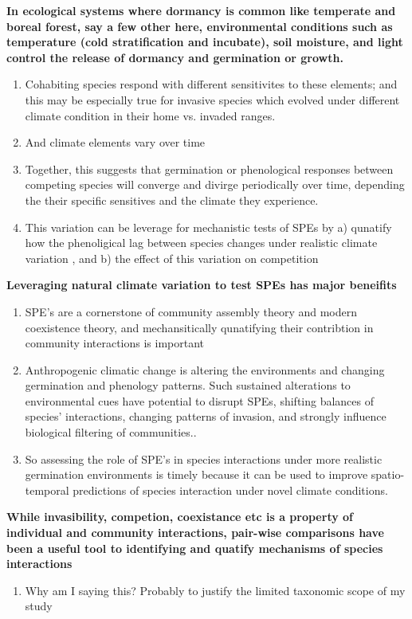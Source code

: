 \documentclass{article}\usepackage[]{graphicx}\usepackage[]{color}
\begin{document}
\textbf{In ecological systems where dormancy is common like temperate  and boreal forest, say a few other here, environmental conditions such as temperature (cold stratification and incubate), soil moisture, and light control the release of dormancy and germination or growth.}
\begin{enumerate}
\item Cohabiting species respond with different sensitivites to these elements; and this may be especially true for invasive species which evolved under different climate condition in their home vs. invaded ranges.
\item And climate elements vary over time
\item Together, this suggests that germination or phenological responses between competing species will converge and divirge periodically over time, depending the their specific sensitives and the climate they experience.
\item This variation can be leverage for mechanistic tests of SPEs by a) qunatify how the phenoligical lag between species changes under realistic climate variation , and b) the effect of this variation on competition
\end{enumerate}

\textbf{Leveraging natural climate variation to test SPEs has major beneifits}
\begin{enumerate}
\item SPE's are a cornerstone of community assembly theory and modern coexistence theory, and mechansitically qunatifying their contribtion in community interactions is important
\item Anthropogenic climatic change is altering the  environments \citep{Walck2011} and changing  germination and phenology patterns. Such sustained alterations to environmental cues have potential to disrupt SPEs, shifting balances of species' interactions, changing patterns of invasion, and strongly influence biological filtering of communities..
\item So assessing the role of SPE's in species interactions under more realistic germination environments is timely because it can be used to improve spatio-temporal predictions of species interaction under novel climate conditions.
\end{enumerate}

\textbf{While invasibility, competion, coexistance etc is a property of individual and community interactions, pair-wise comparisons have been a useful tool to identifying and quatify mechanisms of species interactions}
\begin{enumerate}
\item Why am I saying this? Probably to justify the limited taxonomic scope of my study
\end{enumerate}
\end{document}

